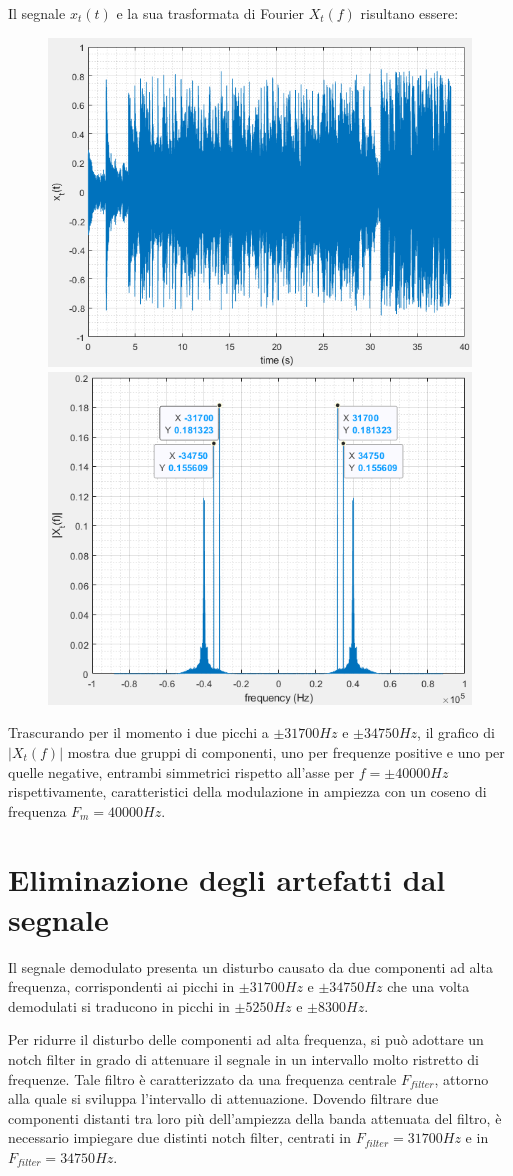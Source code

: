 \documentclass[12pt]{article}
\begin{document}
Il segnale $x_{t}(t)$ e la sua trasformata di Fourier $X_{t}(f)$ risultano essere:
\begin{figure}[H]
	\includegraphics[width=0.5\linewidth]{./images/x_t.png}
	\includegraphics[width=0.5\linewidth]{./images/fft_x_t.png}
\end{figure}

Trascurando per il momento i due picchi a $\pm31700Hz$ e $\pm34750Hz$, il grafico di $|X_{t}(f)|$ mostra due gruppi di componenti, uno per frequenze positive e uno per quelle negative, entrambi simmetrici rispetto all'asse per $f = \pm40000Hz$ rispettivamente, caratteristici della modulazione in ampiezza con un coseno di frequenza $F_{m} = 40000Hz$.

\section{Eliminazione degli artefatti dal segnale}

Il segnale demodulato presenta un disturbo causato da due componenti ad alta frequenza, corrispondenti ai picchi in $\pm31700Hz$ e $\pm34750Hz$ che una volta demodulati si traducono in picchi in $\pm5250Hz$ e $\pm8300Hz$.

Per ridurre il disturbo delle componenti ad alta frequenza, si può adottare un notch filter  in grado di attenuare il segnale in un intervallo molto ristretto di frequenze. Tale filtro è caratterizzato da una frequenza centrale $F_{filter}$, attorno alla quale si sviluppa l'intervallo di attenuazione. Dovendo filtrare due componenti distanti tra loro più dell'ampiezza della banda attenuata del filtro, è necessario impiegare due distinti notch filter, centrati in $F_{filter} = 31700Hz$ e in $F_{filter} = 34750Hz$. 
\end{document}
